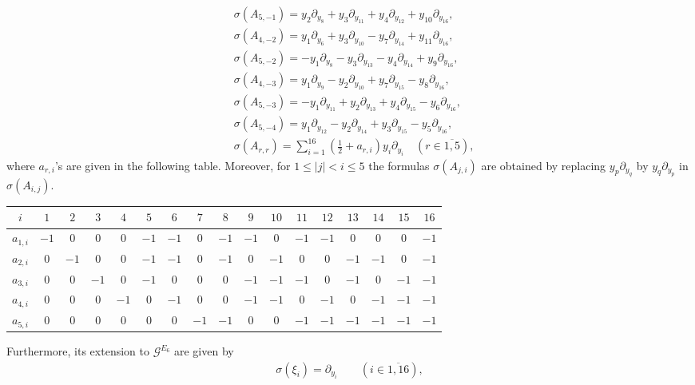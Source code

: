 \documentclass[12pt]{article}
\numberwithin{equation}{section}
\theoremstyle{definition}
\theoremstyle{remark}
\begin{document}
\begin{align}
	&\sigma(A_{5,-1})=y_2\partial_{y_8}+y_3\partial_{y_{11}}+y_4\partial_{y_{12}}+y_{10}\partial_{y_{16}},\\
	&\sigma(A_{4,-2})=y_1\partial_{y_6}+y_3\partial_{y_{10}}-y_7\partial_{y_{14}}+y_{11}\partial_{y_{16}},\\
	&\sigma(A_{5,-2})=-y_1\partial_{y_8}-y_3\partial_{y_{13}}-y_4\partial_{y_{14}}+y_9\partial_{y_{16}},\\
	&\sigma(A_{4,-3})=y_1\partial_{y_9}-y_2\partial_{y_{10}}+y_7\partial_{y_{15}}-y_8\partial_{y_{16}},\\
	&\sigma(A_{5,-3})=-y_1\partial_{y_{11}}+y_2\partial_{y_{13}}+y_4\partial_{y_{15}}-y_6\partial_{y_{16}},\\
	&\sigma(A_{5,-4})=y_1\partial_{y_{12}}-y_2\partial_{y_{14}}+y_3\partial_{y_{15}}-y_5\partial_{y_{16}},\label{2.101}\\
	&\sigma(A_{r,r})=\mathop{\textstyle\sum}\limits_{i=1}^{16}(\frac{1}{2}+a_{r,i})y_i\partial_{y_{i}}\quad(r\in\overline{1,5}),
\end{align}
where $a_{r,i}$'s are given in the following table. Moreover, for $1\leqslant |j|<i\leqslant 5$ the formulas $\sigma(A_{j,i})$ are obtained by replacing $y_p\partial_{y_q}$ by $y_q\partial_{y_p}$ in $\sigma(A_{i,j})$.
\begin{center}
	\renewcommand{\arraystretch}{1.15}
		\begin{tabular}{|c|c|c|c|c|c|c|c|c|c|c|c|c|c|c|c|c|}
			\hline
			$i$&$1$&$2$&$3$&$4$&$5$&$6$&$7$&$8$&$9$&$10$&$11$&$12$&$13$&$14$&$15$&$16$\\
			\hline
			$a_{1,i}$&$-1$&$0$&$0$&$0$&$-1$&$-1$&$0$&$-1$&$-1$&$0$&$-1$&$-1$&$0$&$0$&$0$&$-1$\\
			\hline
			$a_{2,i}$&$0$&$-1$&$0$&$0$&$-1$&$-1$&$0$&$-1$&$0$&$-1$&$0$&$0$&$-1$&$-1$&$0$&$-1$\\
			\hline
			$a_{3,i}$&$0$&$0$&$-1$&$0$&$-1$&$0$&$0$&$0$&$-1$&$-1$&$-1$&$0$&$-1$&$0$&$-1$&$-1$\\
			\hline
			$a_{4,i}$&$0$&$0$&$0$&$-1$&$0$&$-1$&$0$&$0$&$-1$&$-1$&$0$&$-1$&$0$&$-1$&$-1$&$-1$\\
			\hline
			$a_{5,i}$&$0$&$0$&$0$&$0$&$0$&$0$&$-1$&$-1$&$0$&$0$&$-1$&$-1$&$-1$&$-1$&$-1$&$-1$\\
			\hline
		\end{tabular}
\end{center}
Furthermore, its extension to $\mathscr{G}^{E_6}$ are given by
\begin{eqnarray}
	\sigma(\xi_i)=\partial_{y_i} \qquad(i\in\overline{1,16}),
\end{eqnarray}
\end{document}
